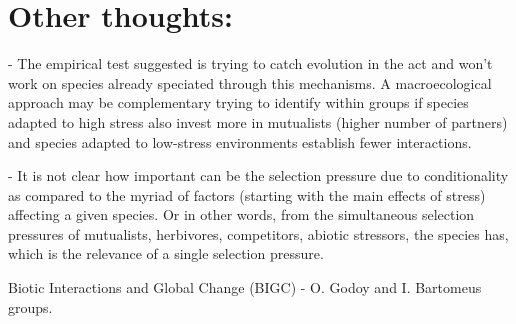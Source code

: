 \documentclass[10pt]{article}
\begin{document}
{\label{888542}}

\section*{Other thoughts:}

{\label{146152}}

- The empirical test suggested is trying to catch evolution in the act
and won't work on species already speciated through this mechanisms. A
macroecological approach may be complementary trying to identify within
groups if species adapted to high stress also invest more in mutualists
(higher number of partners) and species adapted to low-stress
environments establish fewer interactions.

\par\null

- It is not clear how important can be the selection pressure due to
conditionality as compared to the myriad of factors (starting with the
main effects of stress) affecting a given species. Or in other words,
from the simultaneous selection pressures of mutualists, herbivores,
competitors, abiotic stressors, the species has, which is the relevance
of a single selection pressure.~

\par\null\par\null

Biotic Interactions and Global Change (BIGC) - O. Godoy and I. Bartomeus
groups.

\par\null

\FloatBarrier
\end{document}
